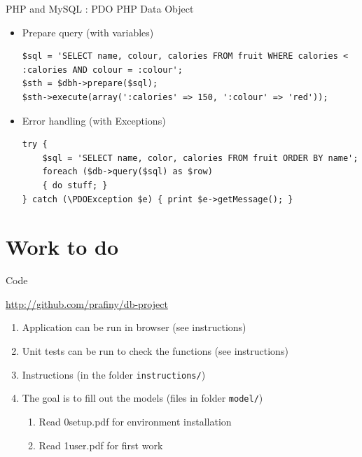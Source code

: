 \documentclass{beamer}
\begin{document}
\begin{frame}[fragile]{PHP and MySQL : PDO}
    PHP Data Object
    
    \begin{itemize}
        \item Prepare query (with variables)
            \begin{lstlisting}
$sql = 'SELECT name, colour, calories FROM fruit WHERE calories < :calories AND colour = :colour';
$sth = $dbh->prepare($sql);
$sth->execute(array(':calories' => 150, ':colour' => 'red'));
            \end{lstlisting}
        \pause
        \item Error handling (with Exceptions)
            \begin{lstlisting}
try {
    $sql = 'SELECT name, color, calories FROM fruit ORDER BY name';
    foreach ($db->query($sql) as $row)
    { do stuff; }
} catch (\PDOException $e) { print $e->getMessage(); }
            \end{lstlisting}
    \end{itemize}
\end{frame}

\section{Work to do}

\begin{frame}{Code}
    \begin{center}
        \url{http://github.com/prafiny/db-project}
    \end{center}

\begin{enumerate}

\item Application can be run in browser (see instructions)
\item Unit tests can be run to check the functions (see instructions)
\item Instructions (in the folder \texttt{instructions/})
\item The goal is to fill out the models (files in folder \texttt{model/})
\begin{enumerate}
\item Read 0setup.pdf for environment installation
\item Read 1user.pdf for first work
\end{enumerate}
\end{enumerate}

\end{frame}
\end{document}
